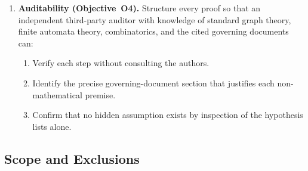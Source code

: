 \documentclass[12pt]{article}
\theoremstyle{definition}
\begin{document}
\begin{enumerate}
    \item \textbf{Auditability (Objective~O4).}
          Structure every proof so that an independent third-party auditor
          with knowledge of standard graph theory, finite automata theory,
          combinatorics, and the cited governing documents can:
          \begin{enumerate}
              \item[O4a.] Verify each step without consulting the
                          authors.
              \item[O4b.] Identify the precise governing-document section
                          that justifies each non-mathematical premise.
              \item[O4c.] Confirm that no hidden assumption exists by
                          inspection of the hypothesis lists alone.
          \end{enumerate}

\end{enumerate}

\subsection{Scope and Exclusions}
\label{sec:intro:scope}
\end{document}

